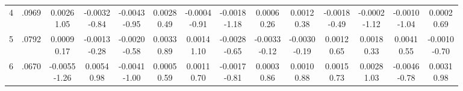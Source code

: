 \begin{landscape}
\begin{center}
{\begin{adjustbox}{max width=\textheight}
\begin{tabular}{lccccccccccccc}
4 & .0969 & \shortstack{0.0026\\1.05} & \shortstack{-0.0032\\-0.84} & \shortstack{-0.0043\\-0.95} & \shortstack{0.0028\\0.49} & \shortstack{-0.0004\\-0.91} & \shortstack{-0.0018\\-1.18} & \shortstack{0.0006\\0.26} & \shortstack{0.0012\\0.38} & \shortstack{-0.0018\\-0.49} & \shortstack{-0.0002\\-1.12} & \shortstack{-0.0010\\-1.04} & \shortstack{0.0002\\0.69} \\
5 & .0792 & \shortstack{0.0009\\0.17} & \shortstack{-0.0013\\-0.28} & \shortstack{-0.0020\\-0.58} & \shortstack{0.0033\\0.89} & \shortstack{0.0014\\1.10} & \shortstack{-0.0028\\-0.65} & \shortstack{-0.0033\\-0.12} & \shortstack{-0.0030\\-0.19} & \shortstack{0.0012\\0.65} & \shortstack{0.0018\\0.33} & \shortstack{0.0041\\0.55} & \shortstack{-0.0010\\-0.70} \\
6 & .0670 & \shortstack{-0.0055\\-1.26} & \shortstack{0.0054\\0.98} & \shortstack{-0.0041\\-1.00} & \shortstack{0.0005\\0.59} & \shortstack{0.0011\\0.70} & \shortstack{-0.0017\\-0.81} & \shortstack{0.0003\\0.86} & \shortstack{0.0010\\0.88} & \shortstack{0.0015\\0.73} & \shortstack{0.0028\\1.03} & \shortstack{-0.0046\\-0.78} & \shortstack{0.0031\\0.98} \\

\end{tabular}
\end{adjustbox}}
\end{center}
\end{landscape}
